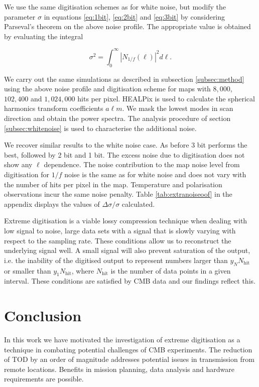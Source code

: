 \documentclass[apj]{emulateapj}
\begin{document}
We use the same digitisation schemes as for white noise, but modify the parameter $\sigma$ in equations \ref{eq:1bit}, \ref{eq:2bit} and \ref{eq:3bit} by considering Parseval's theorem on the above noise profile. The appropriate value is obtained by evaluating the integral

\begin{equation}
\sigma^2 = \int_0^\infty \left| N_{1/f}(\ell) \right|^2 d\ell.
\end{equation}

We carry out the same simulations as described in subsection \ref{subsec:method} using the above noise profile and digitisation scheme for maps with $8,000$, $102,400$ and $1,024,000$ hits per pixel. HEALPix is used to calculate the spherical harmonics transform coefficients $a\ell m$. We mask the lowest modes in scan direction and obtain the power spectra. The analysis procedure of section \ref{subsec:whitenoise} is used to characterise the additional noise.

We recover similar results to the white noise case. As before 3 bit performs the best, followed by 2 bit and 1 bit. The excess noise due to digitisation does not show any $\ell$ dependence. The noise contribution to the map noise level from digitisation for $1/f$ noise is the same as for white noise and does not vary with the number of hits per pixel in the map. Temperature and polarisation observations incur the same noise penalty. Table \ref{tab:extranoiseoof} in the appendix displays the values of $\Delta \sigma / \sigma$ calculated.

Extreme digitisation is a viable lossy compression technique when dealing with low signal to noise, large data sets with a signal that is slowly varying with respect to the sampling rate. These conditions allow us to reconstruct the underlying signal well. A small signal will also prevent saturation of the output, i.e. the inability of the digitised output to represent numbers larger than $y_N N_{\mathrm{hit}}$ or smaller than $y_1 N_{\mathrm{hit}}$, where $N_{\mathrm{hit}}$ is the number of data points in a given interval. These conditions are satisfied by CMB data and our findings reflect this.

\section{Conclusion}
\label{sec:conclusions}

In this work we have motivated the investigation of extreme digitisation as a technique in combating potential challenges of CMB experiments. The reduction of TOD by an order of magnitude addresses potential issues in transmission from remote locations. Benefits in mission planning, data analysis and hardware requirements are possible.
\end{document}

